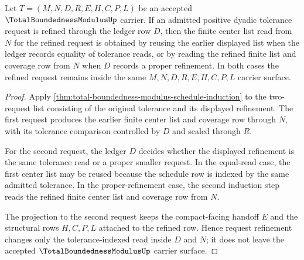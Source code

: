 \begin{theorem}
\label{thm:total-boundedness-modulus-request-monotonicity}
Let $T=(M,N,D,R,E,H,C,P,L)$ be an accepted $\TotalBoundednessModulusUp$ carrier. If an admitted positive dyadic tolerance request is refined through the ledger row $D$, then the finite center list read from $N$ for the refined request is obtained by reusing the earlier displayed list when the ledger records equality of tolerance reads, or by reading the refined finite list and coverage row from $N$ when $D$ records a proper refinement. In both cases the refined request remains inside the same $M,N,D,R,E,H,C,P,L$ carrier surface.
\end{theorem}
\begin{proof}
Apply \autoref{thm:total-boundedness-modulus-schedule-induction} to the two-request list consisting of the original tolerance and its displayed refinement. The first request produces the earlier finite center list and coverage row through $N$, with its tolerance comparison controlled by $D$ and sealed through $R$.

For the second request, the ledger $D$ decides whether the displayed refinement is the same tolerance read or a proper smaller request. In the equal-read case, the first center list may be reused because the schedule row is indexed by the same admitted tolerance. In the proper-refinement case, the second induction step reads the refined finite center list and coverage row from $N$.

The projection to the second request keeps the compact-facing handoff $E$ and the structural rows $H,C,P,L$ attached to the refined row. Hence request refinement changes only the tolerance-indexed read inside $D$ and $N$; it does not leave the accepted $\TotalBoundednessModulusUp$ carrier surface.
\end{proof}



